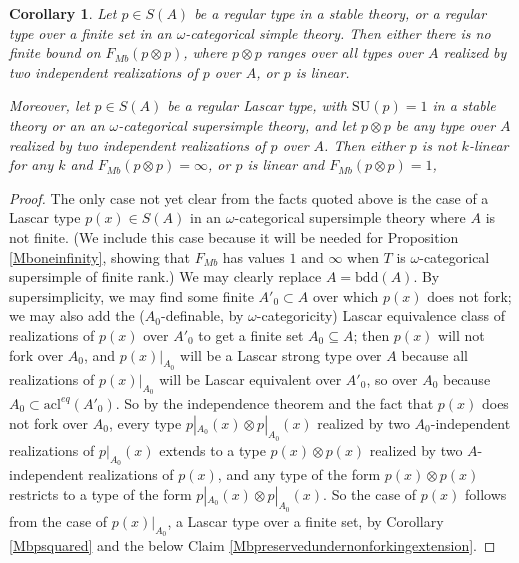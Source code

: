 \documentclass[11pt]{amsart}
\newtheorem{cor}[theorem]{Corollary}
\theoremstyle{definition}
\theoremstyle{remark}
\numberwithin{equation}{section}
\begin{document}
\begin{cor}\label{pseudolinearitymb}
Let  $p \in S(A)$ be a regular type in a stable theory, or a regular type over a finite set in an $\omega$-categorical simple theory. Then either there is no finite bound on $F_{Mb}(p \otimes p)$, where $p \otimes p$ ranges over all types over $A$ realized by two independent realizations of $p$ over $A$, or $p$ is linear.


 
Moreover, let $p \in S(A)$ be a regular \emph{Lascar} type, with $\mathrm{SU}(p) = 1$ in a stable theory or an an $\omega$-categorical supersimple theory, and let $p \otimes p$ be any type over $A$ realized by two independent realizations of $p$ over $A$. Then either $p$ is not $k$-linear for any $k$ and $F_{Mb}(p \otimes p) = \infty$, or $p$ is linear and $F_{Mb}(p\otimes p) =1$,

 \end{cor}
\begin{proof}
    The only case not yet clear from the facts quoted above is the case of a Lascar type $p(x) \in S(A)$ in an $\omega$-categorical supersimple theory where $A$ is not finite. (We include this case because it will be needed for Proposition \ref{Mboneinfinity}, showing that $F_{Mb}$ has values $1$ and $\infty$ when $T$ is $\omega$-categorical supersimple of finite rank.) We may clearly replace $A=\mathrm{bdd}(A)$. By supersimplicity, we may find some finite $A'_{0} \subset A$ over which $p(x)$ does not fork; we may also add the ($A_{0}$-definable, by $\omega$-categoricity) Lascar equivalence class of realizations of $p(x)$ over $A'_{0}$ to get a finite set $A_{0} \subseteq A$; then $p(x)$ will not fork over $A_{0}$, and $p(x) |_{A_{0}}$ will be a Lascar strong type over $A$ because all realizations of $p(x) |_{A_{0}}$ will be Lascar equivalent over $A'_{0}$, so over $A_{0} $ because $A_{0} \subset \mathrm{acl}^{{eq}}(A'_{0})$.  So by the independence theorem and the fact that $p(x)$ does not fork over $A_{0}$, every type $p|_{A_{0}}(x) \otimes p|_{A_{0}}(x) $ realized by two $A_{0}$-independent realizations of $p|_{A_{0}}(x)$ extends to a type $p(x) \otimes p(x)$ realized by two $A$-independent  realizations of $p(x)$, and any type of the form $p(x) \otimes p(x)$  restricts to a type of the form $p|_{A_{0}}(x) \otimes p|_{A_{0}}(x) $. So the case of $p(x)$ follows from the case of $p(x)|_{A_{0}}$, a Lascar type over a finite set, by Corollary \ref{Mbpsquared} and the below Claim \ref{Mbpreservedundernonforkingextension}.
\end{proof}
\end{document}
